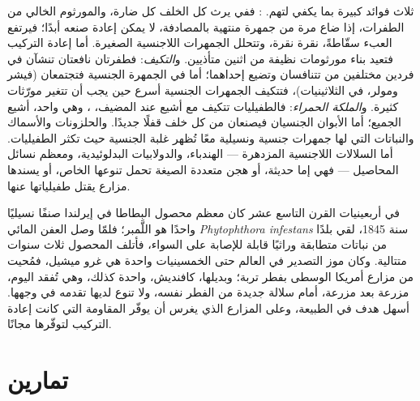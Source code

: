 \begin{proposition}\label{prop:b2:asexual-reproduction:whysex}
ثلاث فوائد كبيرة بما يكفي لتهم. \emph{}:
ففي  يرث كل الخلف كل  ضارة، والمورثوم الخالي من
الطفرات، إذا ضاع مرة من جمهرة منتهية بالمصادفة، لا يمكن
إعادة صنعه أبدًا؛ فيرتفع العبء سقّاطةً، نقرة نقرة،
وتتحلل الجمهرات اللاجنسية الصغيرة. أما إعادة التركيب فتعيد بناء
مورثومات نظيفة من اثنين متأذيين. و\emph{التكيف}: فطفرتان نافعتان
تنشآن في فردين مختلفين من  تتنافسان
وتضيع إحداهما؛ أما في الجمهرة الجنسية فتجتمعان (فيشر ومولر،
في الثلاثينيات)، فتتكيف الجمهرات الجنسية أسرع حين يجب أن تتغير
مورّثات كثيرة. و\emph{الملكة الحمراء}: فالطفيليات تتكيف مع أشيع  عند المضيف، ، وهي  واحد، أشيع الجميع؛ أما
الأبوان الجنسيان فيصنعان من كل خلف قفلًا جديدًا. والحلزونات والأسماك
والنباتات التي لها جمهرات جنسية ونسيلية معًا تُظهر غلبة الجنسية حيث
تكثر الطفيليات. أما السلالات اللاجنسية المزدهرة --- الهندباء،
والدولابيات البدلوئيدية، ومعظم نسائل المحاصيل --- فهي إما حديثة،
أو هجن متعددة الصيغة تحمل تنوعها الخاص، أو يسندها مزارع يقتل
طفيلياتها عنها.
\end{proposition}

\begin{example}\label{ex:b2:asexual-reproduction:monoculture}
في أربعينيات القرن التاسع عشر كان معظم محصول البطاطا في إيرلندا
صنفًا نسيليًا واحدًا هو اللَّمبر؛ فلمّا وصل العفن المائي
\emph{Phytophthora infestans} سنة 1845، لقي بلدًا من نباتات
متطابقة وراثيًا قابلة للإصابة على السواء، فأتلف المحصول ثلاث سنوات
متتالية. وكان موز التصدير في العالم حتى الخمسينيات  واحدة هي
غرو ميشيل، فمُحيت من مزارع أمريكا الوسطى بفطر تربة؛ وبديلها،
كافنديش،  واحدة كذلك، وهي تُفقد اليوم، مزرعة بعد مزرعة، أمام
سلالة جديدة من الفطر نفسه، ولا تنوع لديها تقدمه في وجهها. 
أسهل هدف في الطبيعة، وعلى المزارع الذي يغرس  أن يوفّر المقاومة
التي كانت إعادة التركيب لتوفّرها مجانًا.
\end{example}

\section{تمارين}

